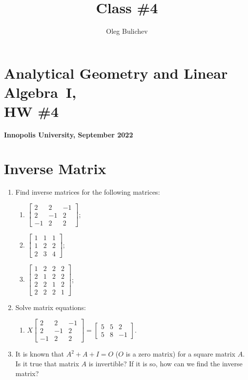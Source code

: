 \documentclass[a4paper,10pt]{article}
\title{Class \#4}
\author{Oleg Bulichev}
\date{}
\begin{document}
\section*{Analytical Geometry and Linear Algebra~I, \\ HW \#4}
\noindent\textbf{Innopolis University, September 2022}
\\

\section{Inverse Matrix}
\begin{enumerate}
\item Find inverse matrices for the following matrices:
\begin{enumerate}
    \item $\begin{bmatrix}2&2&-1\\2&-1&2\\-1&2&2\end{bmatrix}$;
    \item $\begin{bmatrix}1&1&1\\1&2&2\\2&3&4\end{bmatrix}$;
    \item $\begin{bmatrix}1&2&2&2\\2&1&2&2\\2&2&1&2\\2&2&2&1\end{bmatrix}$;
\end{enumerate}

\item Solve matrix equations:
\begin{enumerate}
    \item  $X\begin{bmatrix}2&2&-1\\2&-1&2\\-1&2&2\end{bmatrix}=\begin{bmatrix}5&5&2\\5&8&-1\end{bmatrix}$.
\end{enumerate}

\item It is known that $A^2+A+I=O$ ($O$ is a zero matrix) for a square matrix $A$. Is it true that matrix $A$ is invertible? If it is so, how can we find the inverse matrix?



\end{enumerate}
\end{document}
